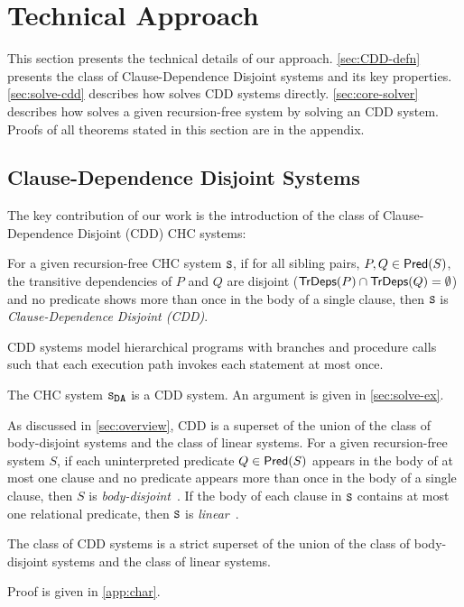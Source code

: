 \section{Technical Approach}
\label{sec:approach}
%
This section presents the technical details of our approach.
%
\autoref{sec:CDD-defn} presents the class of Clause-Dependence Disjoint
systems and its key properties.
%
\autoref{sec:solve-cdd} describes how \sys solves CDD systems
directly.
%
\autoref{sec:core-solver} describes how \sys solves a given
recursion-free system by solving an CDD system.
%
Proofs of all theorems stated in this section are in the appendix.

\subsection{Clause-Dependence Disjoint Systems}
\label{sec:CDD-defn}
%
The key contribution of our work is the introduction of the class of
Clause-Dependence Disjoint (CDD) CHC systems:
%
\begin{defn}
  \label{defn:cdds}
  For a given recursion-free CHC system $\cc{S}$,
  if for all sibling pairs, $P, Q \in \mathsf{Pred}( S )$,
  the transitive dependencies of $P$ and $Q$ are disjoint ($\mathsf{TrDeps}(P) \cap
  \mathsf{TrDeps}(Q) = \emptyset$)
  and no predicate shows more than once in the body of a single clause,
  then $\cc{S}$ is \emph{Clause-Dependence Disjoint (CDD)}.
\end{defn}
%
CDD systems model hierarchical programs with branches and procedure calls such
that each execution path invokes each statement at most once.
%
\begin{ex}
  The CHC system $\mcchc$ is a CDD system. An argument is given in
  \autoref{sec:solve-ex}.
\end{ex}

As discussed in \autoref{sec:overview}, CDD is a superset of the union of
the class of body-disjoint systems and the class of linear systems.
%
For a given recursion-free system $S$, if each uninterpreted predicate $Q \in
\mathsf{Pred}( S )$ appears in the body of at most one clause and no
predicate appears more than once in the body of a single clause,
then $S$ is \emph{body-disjoint}~\cite{rummer13a,rummer13b}.
%
If the body of each clause in $\cc{S}$ contains at most one relational
predicate, then $\cc{S}$ is \emph{linear}~\cite{albarghouthi12a}.

\begin{thm}
\label{thm:cdd-contains}
  The class of CDD systems is a strict superset of the union of the
  class of body-disjoint systems and the class of linear systems.
\end{thm}
%
Proof is given in \autoref{app:char}.

